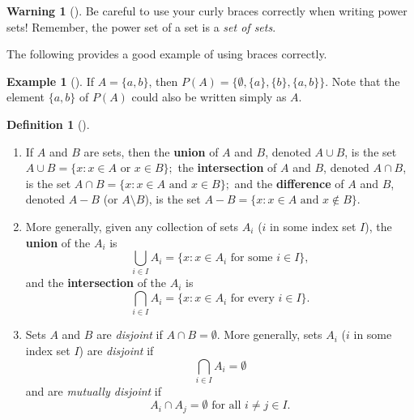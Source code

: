 \documentclass[10pt,]{book}
\newcommand{\terminology}[1]{\textbf{#1}}
\theoremstyle{plain}
\theoremstyle{definition}
\newtheorem{definition}[theorem]{Definition}
\theoremstyle{definition}
\newtheorem{warning}[theorem]{Warning}
\theoremstyle{definition}
\newtheorem{example}[theorem]{Example}
\theoremstyle{definition}
\numberwithin{equation}{section}
\begin{document}
\begin{warning}[]\label{warning-3}
Be careful to use your curly braces correctly when writing power sets! Remember, the power set of a set is a \emph{set of sets}.%
\end{warning}
The following provides a good example of using braces correctly.%
\begin{example}[]\label{example-3}
If \(A=\{a,b\}\), then \(P(A)=\{\emptyset, \{a\}, \{b\}, \{a,b\}\}\). Note that the element \(\{a,b\}\) of \(P(A)\) could also be written simply as \(A\).%
\end{example}
\begin{definition}[{}]\label{definition-5}
\leavevmode%
\begin{enumerate}
\item\hypertarget{li-6}{}If \(A\) and \(B\) are sets, then the \terminology{union} of \(A\) and \(B\), denoted \(A\cup B\), is the set \(A\cup B=\{x: x\in A \text{ or }  x\in B\};\) the \terminology{intersection} of \(A\) and \(B\), denoted \(A\cap B\), is the set \(A\cap B=\{x: x\in A \text{ and }  x\in B\};\) and the \terminology{difference} of \(A\) and \(B\), denoted \(A-B\) (or \(A\setminus B\)), is the set \(A-B=\{x: x\in A \text{ and }  x\not\in B\}.\)%
\item\hypertarget{li-7}{}More generally, given any collection of sets \(A_i\) (\(i\) in some index set \(I\)), the \terminology{union} of the \(A_i\) is%
\begin{equation*}
\bigcup_{i\in I}A_i=\{x: x\in A_i \text{ for some }  i\in I\},
\end{equation*}
and the \terminology{intersection} of the \(A_i\) is%
\begin{equation*}
\bigcap_{i\in I}A_i=\{x: x\in A_i \text{ for every }  i\in I\}.
\end{equation*}
%
\item\hypertarget{li-8}{}Sets \(A\) and \(B\) are \emph{disjoint} if \(A\cap B=\emptyset\).  More generally, sets \(A_i\) (\(i\) in some index set \(I\)) are \emph{disjoint} if%
\begin{equation*}
\bigcap_{i\in I}A_i=\emptyset
\end{equation*}
and are \emph{mutually disjoint} if%
\begin{equation*}
A_i\cap A_j=\emptyset \mbox{ for all } i\neq j \in I.
\end{equation*}
%
\end{enumerate}
\label{notation-17}
\label{notation-18}
\label{notation-19}
\end{definition}
\end{document}
